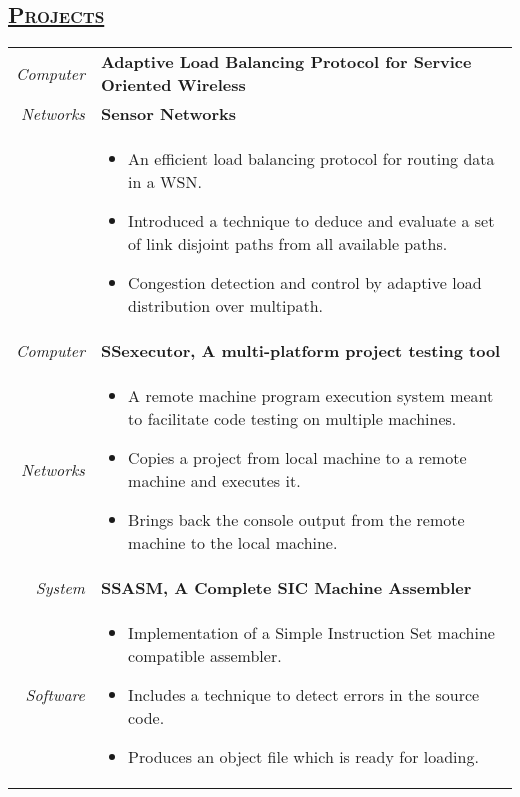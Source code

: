 \documentclass[14pt]{article}
\begin{document}
\subsection* {\scshape\LARGE\uline {Projects}}
\begin{tabularx}{\textwidth}{r X}
\emph{Computer} & \textbf{Adaptive Load Balancing Protocol for Service Oriented Wireless} \\
\emph{Networks} & \textbf{Sensor Networks} \\
                             & \begin{itemize}[noitemsep,topsep=0pt]
						\item  An efficient load balancing protocol for routing data in a WSN. 
                             	\item Introduced a technique to deduce and evaluate a set of link disjoint paths from all available paths. 
				   		\item Congestion detection and control by adaptive load distribution over multipath. 
						\end{itemize}
\\
\emph{Computer} & \textbf{SSexecutor, A multi-platform project testing tool} \\
\emph{Networks} & \begin{itemize}[noitemsep,topsep=0pt] 
					  \item A remote machine program execution system meant to facilitate code testing on multiple machines. 
                             \item Copies a project from local machine to a remote machine and executes it. 
				   	  \item Brings back the console output from the remote machine to the local machine. 
					  \end{itemize}
\\
\emph{System} & \textbf{SSASM, A Complete SIC Machine Assembler} \\
\emph{Software} & \begin{itemize}[noitemsep,topsep=0pt]
					  \item Implementation of a Simple Instruction Set machine compatible assembler. 
					  \item Includes a technique to detect errors in the source code. 
					  \item Produces an object file which is ready for loading. 
					  \end{itemize}
\end{tabularx}
\end{document}
